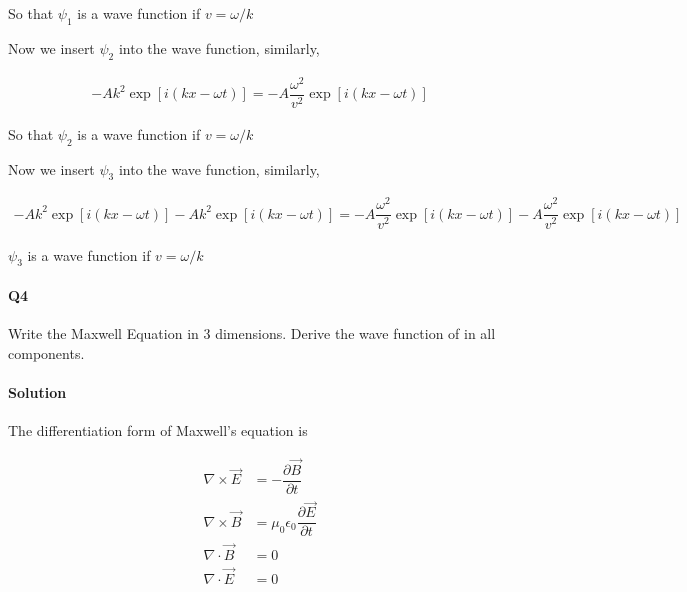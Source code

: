 \documentclass{article}
\begin{document}
So that $\psi_1$ is a wave function if $v = \omega / k$

Now we insert $\psi_2$ into the wave function, similarly,


\begin{equation*}
  \begin{aligned}
     - A k^2 \exp \left[ i \left( k x - \omega t \right) \right] = - A \dfrac{\omega^2 }{v^{2}} \exp \left[ i \left( k x - \omega t \right)\right]
  \end{aligned}
\end{equation*}

So that $\psi_2$ is a wave function if $v = \omega / k$

Now we insert $\psi_3$ into the wave function, similarly,

\begin{equation*}
  \begin{aligned}
     - A k^2 \exp \left[ i \left( k x - \omega t \right) \right] - A k^2 \exp \left[ i \left( k x - \omega t \right) \right] = - A \dfrac{\omega^2 }{v^{2}} \exp \left[ i \left( k x - \omega t \right)\right]- A \dfrac{\omega^2 }{v^{2}} \exp \left[ i \left( k x - \omega t \right)\right]
  \end{aligned}
\end{equation*}

$\psi_3$ is a wave function if $v = \omega / k$

\paragraph{Q4}

Write the Maxwell Equation in 3 dimensions. Derive the wave function of in all components.

\paragraph{Solution}

The differentiation form of Maxwell's equation is

\begin{equation*}
  \begin{aligned}
    \nabla \times \vec{E} &= - \dfrac{\partial \vec{B}}{\partial t} \\
    \nabla \times \vec{B} &= \mu_0 \epsilon_0 \dfrac{\partial \vec{E}}{\partial t} \\
    \nabla \cdot \vec{B} &= 0 \\
    \nabla \cdot \vec{E} &= 0
  \end{aligned}
\end{equation*}
\end{document}
